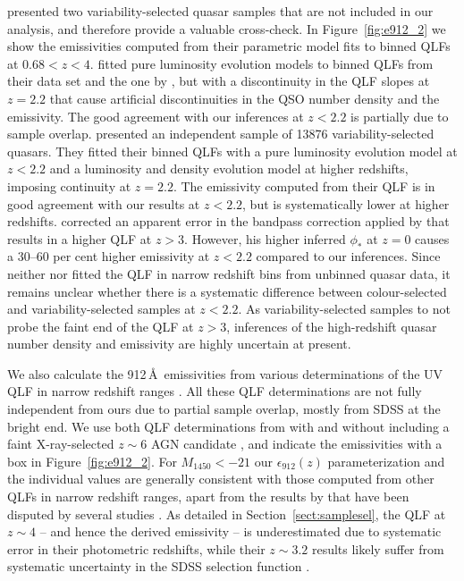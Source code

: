\documentclass[fleqn,usenatbib]{mnras}
\begin{document}
\citet{2013A&A...551A..29P,2016A&A...587A..41P} presented two variability-selected quasar
samples that are not included in our analysis, and therefore provide a valuable cross-check.
In Figure~\ref{fig:e912_2} we show the emissivities computed from their parametric model fits
to binned QLFs at $0.68<z<4$. \citet{2013A&A...551A..29P} fitted pure luminosity evolution
models to binned QLFs from their data set and the one by \citet{2009MNRAS.399.1755C},
but with a discontinuity in the QLF slopes at $z=2.2$ that cause artificial discontinuities
in the QSO number density and the emissivity. The good agreement with our inferences at
$z<2.2$ is partially due to sample overlap. \citet{2016A&A...587A..41P} presented an
independent sample of 13876 variability-selected quasars. They fitted their binned QLFs
with a pure luminosity evolution model at $z<2.2$ and a luminosity and density evolution
model at higher redshifts, imposing continuity at $z=2.2$. The emissivity computed from
their QLF is in good agreement with our results at $z<2.2$, but is systematically lower at
higher redshifts. \citet{2017A&A...608A..64C} corrected an apparent error in the bandpass
correction applied by \citet{2016A&A...587A..41P} that results in a higher QLF at $z>3$.
However, his higher inferred $\phi_*$ at $z=0$ causes a 30--60 per cent higher emissivity
at $z<2.2$ compared to our inferences. Since neither \citet{2013A&A...551A..29P,2016A&A...587A..41P}
nor \citet{2017A&A...608A..64C} fitted the QLF in narrow redshift bins from unbinned quasar data,
it remains unclear whether there is a systematic difference between colour-selected and
variability-selected samples at $z<2.2$. As variability-selected samples to not probe the faint end of the
QLF at $z>3$, inferences of the high-redshift quasar number density and emissivity are highly uncertain at present.

We also calculate the 912\,\AA\ emissivities from various determinations of the UV QLF in narrow redshift ranges
\citep{2009A&A...507..781S,2012ApJ...755..169M,2015AA...578A..83G,2017ApJ...847L..15O,2018PASJ...70S..34A,2018AJ....155..131M,2018MNRAS.474.2904P}.
All these QLF determinations are not fully independent from ours due to partial sample overlap,
mostly from SDSS at the bright end. We use both QLF determinations from \citet{2017ApJ...847L..15O}
with and without including a faint X-ray-selected $z\sim 6$ AGN candidate \citep{2018MNRAS.474.2904P},
and indicate the emissivities with a box in Figure~\ref{fig:e912_2}.  
For $M_{1450}<-21$ our $\epsilon_{912}\left(z\right)$ parameterization and the individual values
are generally consistent with those computed from other QLFs in narrow redshift ranges,
apart from the results by \citet{2015AA...578A..83G} that have been disputed by several studies
\citep[][see Appendix~\ref{sec:conv} for further discussion]{2015MNRAS.453.1946G,2016MNRAS.463..348V,2017MNRAS.465.1915R,2018AJ....155..131M,2018MNRAS.474.2904P}. 
As detailed in Section~\ref{sect:samplesel}, the \citet{2012ApJ...755..169M} QLF at $z\sim 4$ -- and hence the
derived emissivity -- is underestimated due to systematic error in their photometric redshifts,
while their $z\sim 3.2$ results likely suffer from systematic uncertainty in the SDSS selection function
\citep{2011ApJ...728...23W,2012ApJS..199....3R,2013ApJ...773...14R}.
\end{document}
